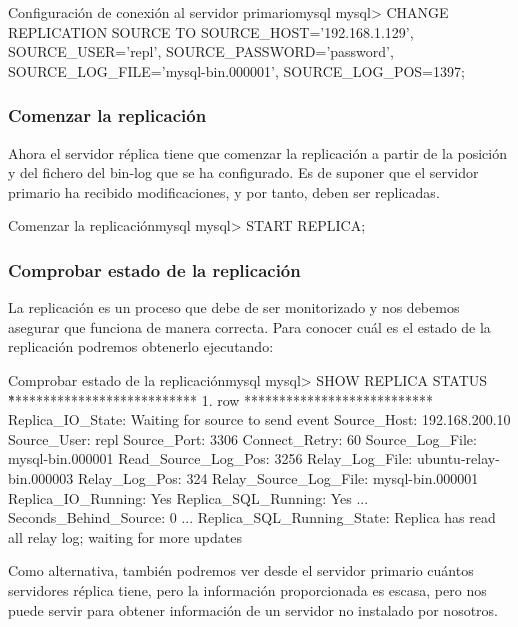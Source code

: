 \begin{mycode}{Configuración de conexión al servidor primario}{mysql}{}
mysql> CHANGE REPLICATION SOURCE TO
          SOURCE_HOST='192.168.1.129',
          SOURCE_USER='repl',
          SOURCE_PASSWORD='password',
          SOURCE_LOG_FILE='mysql-bin.000001',
          SOURCE_LOG_POS=1397;
\end{mycode}

\subsubsection{Comenzar la replicación}
Ahora el servidor réplica tiene que comenzar la replicación a partir de la posición y del fichero del bin-log que se ha configurado. Es de suponer que el servidor primario ha recibido modificaciones, y por tanto, deben ser replicadas.

\begin{mycode}{Comenzar la replicación}{mysql}{}
mysql> START REPLICA;
\end{mycode}


\subsubsection{Comprobar estado de la replicación}
La replicación es un proceso que debe de ser monitorizado y nos debemos asegurar que funciona de manera correcta. Para conocer cuál es el estado de la replicación podremos obtenerlo ejecutando:

\begin{mycode}{Comprobar estado de la replicación}{mysql}{}
mysql> SHOW REPLICA STATUS \G
*************************** 1. row ***************************
         Replica_IO_State: Waiting for source to send event
              Source_Host: 192.168.200.10
              Source_User: repl
              Source_Port: 3306
            Connect_Retry: 60
          Source_Log_File: mysql-bin.000001
      Read_Source_Log_Pos: 3256
           Relay_Log_File: ubuntu-relay-bin.000003
            Relay_Log_Pos: 324
    Relay_Source_Log_File: mysql-bin.000001
       Replica_IO_Running: Yes
      Replica_SQL_Running: Yes
...
    Seconds_Behind_Source: 0
...
Replica_SQL_Running_State: Replica has read all relay log;
waiting for more updates
\end{mycode}


Como alternativa, también podremos ver desde el servidor primario cuántos servidores réplica tiene, pero la información proporcionada es escasa, pero nos puede servir para obtener información de un servidor no instalado por nosotros.

